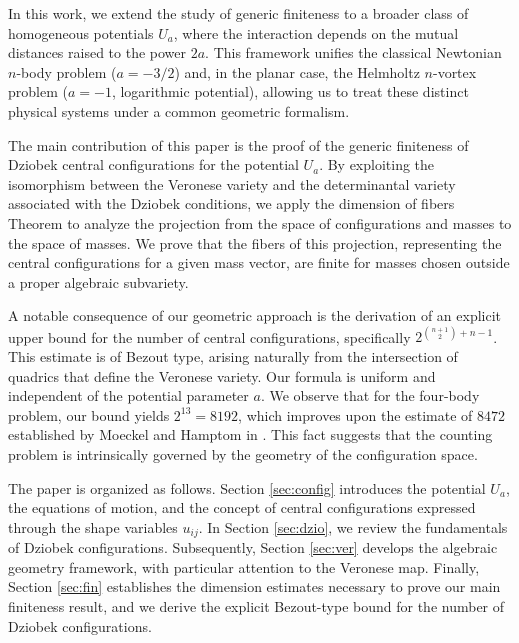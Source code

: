 \documentclass{amsart}
\theoremstyle{definition}
\theoremstyle{remark}
\numberwithin{equation}{section}
\begin{document}
In this work, we extend the study of generic finiteness to a broader class of homogeneous potentials $U_a$, where the interaction depends on the mutual distances raised to the power $2a$. This framework unifies the classical Newtonian $n$-body problem ($a = -3/2$) and, in the planar case, the Helmholtz $n$-vortex problem ($a = -1$, logarithmic potential), allowing us to treat these distinct physical systems under a common geometric formalism.

The main contribution of this paper is the proof of the generic finiteness of Dziobek central configurations for the potential $U_a$. By exploiting the isomorphism between the Veronese variety and the determinantal variety associated with the Dziobek conditions, we apply the dimension of fibers Theorem to analyze the projection from the space of configurations and masses to the space of masses. We prove that the fibers of this projection, representing the central configurations for a given mass vector, are finite for masses chosen outside a proper algebraic subvariety.

A notable consequence of our geometric approach is the derivation of an explicit upper bound for the number of central configurations, specifically $2^{\binom{n+1}{2}+n-1}$. This estimate is of Bezout type, arising naturally from the intersection of quadrics that define the Veronese variety. Our formula is uniform and independent of the potential parameter $a$. We observe that for the four-body problem, our bound yields $2^{13} = 8192$, which improves upon the estimate of $8472$ established by Moeckel and Hamptom in \cite{hampton2006finiteness}. This fact suggests that the counting problem is intrinsically governed by the  geometry of the configuration space.

The paper is organized as follows. Section \ref{sec:config} introduces the potential $U_a$, the equations of motion, and the concept of central configurations expressed through the shape variables $u_{ij}$. In Section \ref{sec:dzio}, we review the fundamentals of Dziobek configurations. Subsequently, Section \ref{sec:ver} develops the algebraic geometry framework, with particular attention to the Veronese map. Finally, Section \ref{sec:fin} establishes the dimension estimates necessary to prove our main finiteness result, and we derive the explicit Bezout-type bound for the number of Dziobek configurations.

                                                                                                                                      
\end{document}
